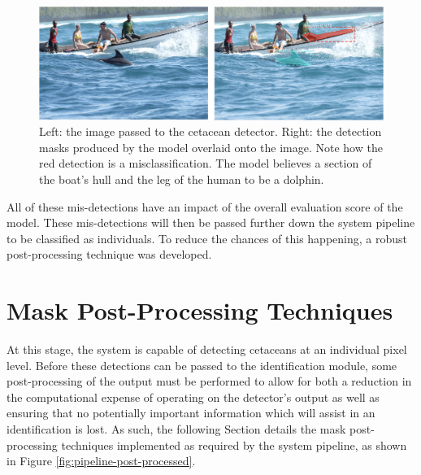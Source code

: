 \begin{figure}[h]
	\begin{center}
		\includegraphics[scale=0.6]{Chapter3/figs/model-fail-boat.png}
	\end{center}
	\caption[Left: the image passed to the cetacean detector. Right: the detection masks produced by the model overlaid onto the image.]{Left: the image passed to the cetacean detector. Right: the detection masks produced by the model overlaid onto the image. Note how the red detection is a misclassification. The model believes a section of the boat's hull and the leg of the human to be a dolphin.}
	\label{fig:model-fail-boat}
\end{figure}

All of these mis-detections have an impact of the overall evaluation score of the model. These mis-detections will then be passed further down the system pipeline to be classified as individuals. To reduce the chances of this happening, a robust post-processing technique was developed.

\section{Mask Post-Processing Techniques}\label{ch:cetDet,sec:postProcessing}

At this stage, the system is capable of detecting cetaceans at an individual pixel level. Before these detections can be passed to the identification module, some post-processing of the output must be performed to allow for both a reduction in the computational expense of operating on the detector's output as well as ensuring that no potentially important information which will assist in an identification is lost. As such, the following Section details the mask post-processing techniques implemented as required by the system pipeline, as shown in Figure \ref{fig:pipeline-post-processed}.

